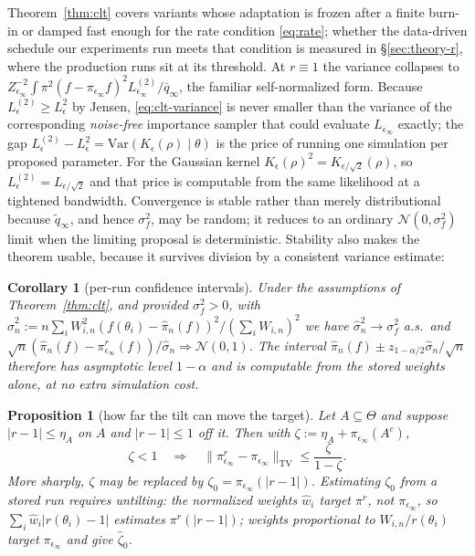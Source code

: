 \documentclass[10pt]{article}
\theoremstyle{plain}
\newtheorem{proposition}[theorem]{Proposition}
\newtheorem{corollary}[theorem]{Corollary}
\theoremstyle{definition}
\begin{document}
Theorem~\ref{thm:clt} covers variants whose adaptation is frozen after a finite burn-in or damped fast enough for the rate condition \eqref{eq:rate}; whether the data-driven schedule our experiments run meets that condition is measured in \S\ref{sec:theory-r}, where the production runs sit at its threshold. At $r\equiv1$ the variance collapses to $Z_{\epsilon_\infty}^{-2}\int\pi^2(f-\pi_{\epsilon_\infty}f)^2L^{(2)}_{\epsilon_\infty}/\bar q_\infty$, the familiar self-normalized form. Because $L^{(2)}_\epsilon\ge L^2_\epsilon$ by Jensen, \eqref{eq:clt-variance} is never smaller than the variance of the corresponding \emph{noise-free} importance sampler that could evaluate $L_{\epsilon_\infty}$ exactly; the gap $L^{(2)}_\epsilon-L^2_\epsilon=\mathrm{Var}(K_\epsilon(\rho)\mid\theta)$ is the price of running one simulation per proposed parameter. For the Gaussian kernel $K_\epsilon(\rho)^2=K_{\epsilon/\sqrt2}(\rho)$, so $L^{(2)}_\epsilon=L_{\epsilon/\sqrt2}$ and that price is computable from the same likelihood at a tightened bandwidth. Convergence is stable rather than merely distributional because $\tilde q_\infty$, and hence $\sigma^2_f$, may be random; it reduces to an ordinary $\mathcal{N}(0,\sigma^2_f)$ limit when the limiting proposal is deterministic. Stability also makes the theorem usable, because it survives division by a consistent variance estimate:

\begin{corollary}[per-run confidence intervals]\label{cor:ci}
Under the assumptions of Theorem~\ref{thm:clt}, and provided $\sigma^2_f>0$, with
$\widehat\sigma_n^2 := n\sum_i W_{i,n}^2(f(\theta_i)-\widehat\pi_n(f))^2 / (\sum_i W_{i,n})^2$
we have $\widehat\sigma^2_n\to\sigma^2_f$ a.s.\ and $\sqrt n(\widehat\pi_n(f)-\pi^r_{\epsilon_\infty}(f))/\widehat\sigma_n\Rightarrow\mathcal{N}(0,1)$. The interval $\widehat\pi_n(f)\pm z_{1-\alpha/2}\widehat\sigma_n/\sqrt n$ therefore has asymptotic level $1-\alpha$ and is computable from the stored weights alone, at no extra simulation cost.
\end{corollary}

\begin{proposition}[how far the tilt can move the target]\label{prop:tilt}
Let $A\subseteq\Theta$ and suppose $|r-1|\le\eta_A$ on $A$ and $|r-1|\le1$ off it. Then with $\zeta:=\eta_A+\pi_{\epsilon_\infty}(A^c)$,
\begin{equation}
\zeta<1\quad\Longrightarrow\quad\bigl\|\pi^r_{\epsilon_\infty}-\pi_{\epsilon_\infty}\bigr\|_{\mathrm{TV}}\le\frac{\zeta}{1-\zeta}.
\label{eq:tilt-bound}
\end{equation}
More sharply, $\zeta$ may be replaced by $\zeta_0=\pi_{\epsilon_\infty}(|r-1|)$. Estimating $\zeta_0$ from a stored run requires \emph{untilting}: the normalized weights $\widehat w_i$ target $\pi^r$, not $\pi_{\epsilon_\infty}$, so $\sum_i\widehat w_i|r(\theta_i)-1|$ estimates $\pi^r(|r-1|)$; weights proportional to $W_{i,n}/r(\theta_i)$ target $\pi_{\epsilon_\infty}$ and give $\widehat\zeta_0$.
\end{proposition}
\end{document}
